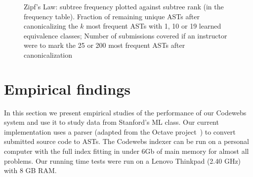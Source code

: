 \begin{figure}[t!]
\center
{}

\caption[How use of equivalence classes change teacher impact]{
Zipf's Law: subtree frequency plotted against subtree rank (in the frequency table). %
 Fraction of remaining unique ASTs after canonicalizing the $k$ most frequent ASTs with 1, 10 or 19 learned equivalence classes;
 Number of submissions covered if an instructor were to mark the 25 or 200 most frequent ASTs after canonicalization
}

\label{fig:zipfreduction}
\end{figure}

\section{Empirical findings}\label{sec:evaluation}
In this section we present  empirical studies
of the performance of our Codewebs system and use it to study data from Stanford's ML class.
Our current implementation uses a parser (adapted from the Octave project~\cite{eaton97}) to convert
submitted source code to ASTs.   The Codewebs indexer can be run on a personal
computer with the full index fitting in under 6Gb of main memory for almost all problems.
Our running time tests were run on a %
Lenovo Thinkpad 
(2.40 GHz) with 8 GB RAM.


